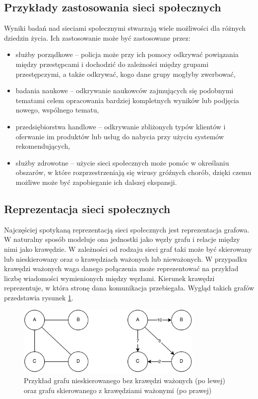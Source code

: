 \subsection{Przykłady zastosowania sieci społecznych}
Wyniki badań nad sieciami społecznymi stwarzają wiele możliwości dla różnych
dziedzin życia. Ich zastosowanie może być zastosowane przez:
\begin{itemize}
  \item służby porządkowe -- policja może przy ich pomocy odkrywać powiązania
  między przestępcami i dochodzić do zależności między grupami przestępczymi,
  a także odkrywać, kogo dane grupy mogłyby zwerbować, 
  \item badania naukowe -- odkrywanie naukowców zajmujących się podobnymi tematami
  celem opracowania bardziej kompletnych wyników lub podjęcia nowego,
  wspólnego tematu,
  \item przedsiębiorstwa handlowe -- odkrywanie zbliżonych typów klientów i 
  oferwanie im produktów lub usług do nabycia przy użyciu systemów rekomendujących,
  \item służby zdrowotne -- użycie sieci społecznych może pomóc w określaniu
  obszarów, w które rozprzestrzeniają się wirusy gróźnych chorób, dzięki czemu
  możliwe może być zapobieganie ich dalszej ekspansji.
\end{itemize}



\subsection{Reprezentacja sieci społecznych}
Najczęściej spotykaną reprezentacją sieci społecznych jest reprezentacja grafowa.
W naturalny sposób modeluje ona jednostki jako węzły grafu i relacje między nimi
jako krawędzie. W zależności od rodzaju sieci graf taki może być skierowany lub 
nieskierowany oraz o krawędziach ważonych lub nieważonych. W przypadku
krawędzi ważonych waga danego połączenia może reprezentować na przykład
liczbę wiadomości wymienionych między węzłami. Kierunek krawędzi reprezentuje,
w która stronę dana komunikacja przebiegała. Wygląd takich grafów przedstawia rysunek 
\ref{image:graf-reprezentacja}.

\begin{figure}[ht!]
\centering
\includegraphics[width=90mm]{img/graf-reprezentacja.png}
\caption{Przykład grafu nieskierowanego bez krawędzi ważonych (po lewej)
oraz grafu skierowanego z krawędziami ważonymi (po prawej)}
\label{image:graf-reprezentacja}
\end{figure}




